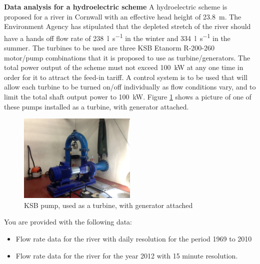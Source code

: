 \documentclass[a4paper,12pt,fleqn]{article}
\begin{document}

\textbf{Data analysis for a  hydroelectric scheme}
\newline\newline
A hydroelectric scheme is proposed for a river in Cornwall with an effective head height of \SI{23.8}{\metre}. The Environment Agency has stipulated that the depleted stretch of the river should have a hands off flow rate of \SI{238}{\litre\per\second} in the winter and \SI{334}{\litre\per\second} in the summer.
\newline\newline
The turbines to be used are three KSB Etanorm R-200-260 motor/pump combinations that it is proposed to use as turbine/generators. The total power output of the scheme must not exceed \SI{100}{\kilo\watt} at any one time in order for it to attract the feed-in tariff.
\newline\newline
A control system is to be used that will allow each turbine to be turned on/off individually as flow conditions vary, and to limit the total shaft output power to \SI{100}{\kilo\watt}.
\newline\newline
Figure \ref{fig:ksb} shows a picture of one of these pumps installed as a turbine, with generator attached.

\begin{figure}[h]
\centering
\includegraphics[width=0.5\textwidth]{./figures/ksb-pump}
\caption{KSB pump, used as a turbine, with generator attached}
\label{fig:ksb}
\end{figure}

You are provided with the following data:
\begin{itemize}
\item Flow rate data for the river with daily resolution for the period 1969 to 2010
\item Flow rate data for the river for the year 2012 with 15 minute resolution.
\end{itemize}
\end{document}
